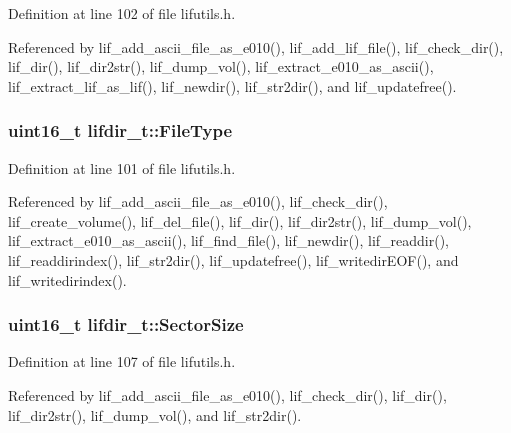 Definition at line 102 of file lifutils.\+h.



Referenced by lif\+\_\+add\+\_\+ascii\+\_\+file\+\_\+as\+\_\+e010(), lif\+\_\+add\+\_\+lif\+\_\+file(), lif\+\_\+check\+\_\+dir(), lif\+\_\+dir(), lif\+\_\+dir2str(), lif\+\_\+dump\+\_\+vol(), lif\+\_\+extract\+\_\+e010\+\_\+as\+\_\+ascii(), lif\+\_\+extract\+\_\+lif\+\_\+as\+\_\+lif(), lif\+\_\+newdir(), lif\+\_\+str2dir(), and lif\+\_\+updatefree().

\subsubsection[{\texorpdfstring{File\+Type}{FileType}}]{\setlength{\rightskip}{0pt plus 5cm}uint16\+\_\+t lifdir\+\_\+t\+::\+File\+Type}\hypertarget{structlifdir__t_a7a93a706ac4bb88f65826619c9b02231}{}\label{structlifdir__t_a7a93a706ac4bb88f65826619c9b02231}


Definition at line 101 of file lifutils.\+h.



Referenced by lif\+\_\+add\+\_\+ascii\+\_\+file\+\_\+as\+\_\+e010(), lif\+\_\+check\+\_\+dir(), lif\+\_\+create\+\_\+volume(), lif\+\_\+del\+\_\+file(), lif\+\_\+dir(), lif\+\_\+dir2str(), lif\+\_\+dump\+\_\+vol(), lif\+\_\+extract\+\_\+e010\+\_\+as\+\_\+ascii(), lif\+\_\+find\+\_\+file(), lif\+\_\+newdir(), lif\+\_\+readdir(), lif\+\_\+readdirindex(), lif\+\_\+str2dir(), lif\+\_\+updatefree(), lif\+\_\+writedir\+E\+O\+F(), and lif\+\_\+writedirindex().

\subsubsection[{\texorpdfstring{Sector\+Size}{SectorSize}}]{\setlength{\rightskip}{0pt plus 5cm}uint16\+\_\+t lifdir\+\_\+t\+::\+Sector\+Size}\hypertarget{structlifdir__t_adf3c38eecddce15925157383ff38ef2d}{}\label{structlifdir__t_adf3c38eecddce15925157383ff38ef2d}


Definition at line 107 of file lifutils.\+h.



Referenced by lif\+\_\+add\+\_\+ascii\+\_\+file\+\_\+as\+\_\+e010(), lif\+\_\+check\+\_\+dir(), lif\+\_\+dir(), lif\+\_\+dir2str(), lif\+\_\+dump\+\_\+vol(), and lif\+\_\+str2dir().

